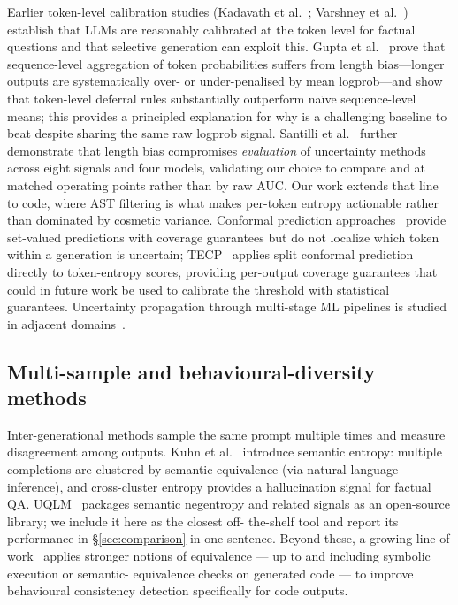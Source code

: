 Earlier token-level calibration studies (Kadavath et
al.~\cite{kadavath2022language}; Varshney et
al.~\cite{varshney2023stitch}) establish that LLMs are reasonably
calibrated at the token level for factual questions and that
selective generation can exploit this. Gupta et
al.~\cite{gupta2024cascades} prove that sequence-level aggregation of
token probabilities suffers from length bias---longer outputs are
systematically over- or under-penalised by mean logprob---and show
that token-level deferral rules substantially outperform na\"{i}ve
sequence-level means; this provides a principled explanation for why
\papg is a challenging baseline to beat despite sharing the same raw
logprob signal. Santilli et al.~\cite{santilli2025length} further
demonstrate that length bias compromises \emph{evaluation} of
uncertainty methods across eight signals and four models, validating
our choice to compare \eps and \papg at matched operating points
rather than by raw AUC. Our work extends that line to
code, where AST filtering is what makes per-token entropy actionable
rather than dominated by cosmetic variance. Conformal prediction
approaches~\cite{quach2023conformal,angelopoulos2022conformal}
provide set-valued predictions with coverage guarantees but do not
localize which token within a generation is uncertain; TECP~\cite{xu2025tecp}
applies split conformal prediction directly to token-entropy scores,
providing per-output coverage guarantees that could in future work be
used to calibrate the \eps threshold with statistical guarantees. Uncertainty
propagation through multi-stage ML pipelines is studied in adjacent
domains~\cite{jungo2020analyzing}.

\subsection{Multi-sample and behavioural-diversity methods}
\label{subsec:related-multisample}

Inter-generational methods sample the same prompt multiple times and
measure disagreement among outputs. Kuhn et
al.~\cite{kuhn2023semantic} introduce semantic entropy: multiple
completions are clustered by semantic equivalence (via natural
language inference), and cross-cluster entropy provides a
hallucination signal for factual QA.
UQLM~\cite{uqlm2024} packages semantic negentropy and related signals
as an open-source library; we include it here as the closest off-%
the-shelf tool and report its performance in \S\ref{sec:comparison}
in one sentence. Beyond these, a growing line of
work~\cite{sharma2025multisample} applies stronger notions of
equivalence --- up to and including symbolic execution or semantic-%
equivalence checks on generated code --- to improve behavioural
consistency detection specifically for code outputs.


